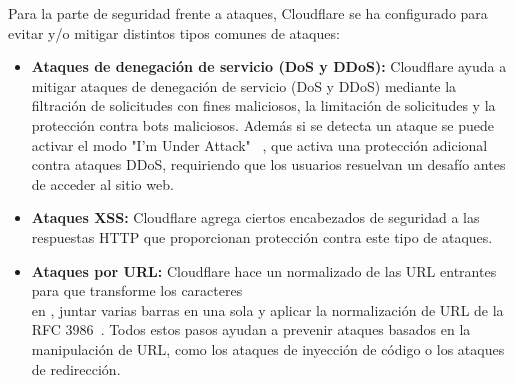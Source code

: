 Para la parte de seguridad frente a ataques, Cloudflare se ha configurado para evitar y/o mitigar distintos tipos comunes de ataques:
\begin{itemize}
    \item \textbf{Ataques de denegación de servicio (DoS y DDoS):} Cloudflare ayuda a mitigar ataques de denegación de servicio (DoS y DDoS) mediante la filtración de solicitudes con fines maliciosos, la limitación de solicitudes y la protección contra bots maliciosos. Además si se detecta un ataque se puede activar el modo "I'm Under Attack" ~\cite{CloudflareTeam2025}, que activa una protección adicional contra ataques DDoS, requiriendo que los usuarios resuelvan un desafío antes de acceder al sitio web.
    
    \item \textbf{Ataques XSS:} Cloudflare agrega ciertos encabezados de seguridad a las respuestas HTTP que proporcionan protección contra este tipo de ataques.

    \item \textbf{Ataques por URL:} Cloudflare hace un normalizado de las URL entrantes para que transforme los caracteres \\ en \/, juntar varias barras en una sola y aplicar la normalización de URL de la RFC 3986~\cite{CloudflareTeam2024}.    
    Todos estos pasos ayudan a prevenir ataques basados en la manipulación de URL, como los ataques de inyección de código o los ataques de redirección.
\end{itemize}